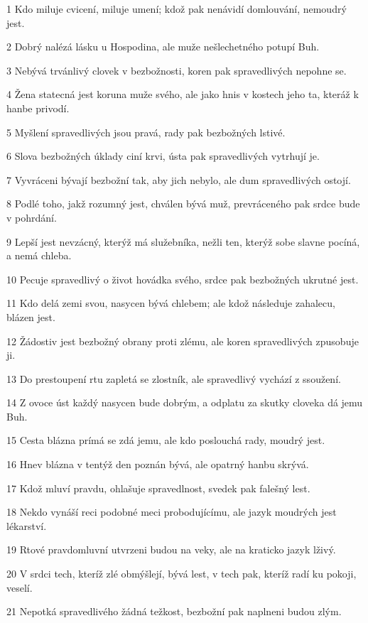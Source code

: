 \par 1 Kdo miluje cvicení, miluje umení; kdož pak nenávidí domlouvání, nemoudrý jest.
\par 2 Dobrý nalézá lásku u Hospodina, ale muže nešlechetného potupí Buh.
\par 3 Nebývá trvánlivý clovek v bezbožnosti, koren pak spravedlivých nepohne se.
\par 4 Žena statecná jest koruna muže svého, ale jako hnis v kostech jeho ta, kteráž k hanbe privodí.
\par 5 Myšlení spravedlivých jsou pravá, rady pak bezbožných lstivé.
\par 6 Slova bezbožných úklady ciní krvi, ústa pak spravedlivých vytrhují je.
\par 7 Vyvráceni bývají bezbožní tak, aby jich nebylo, ale dum spravedlivých ostojí.
\par 8 Podlé toho, jakž rozumný jest, chválen bývá muž, prevráceného pak srdce bude v pohrdání.
\par 9 Lepší jest nevzácný, kterýž má služebníka, nežli ten, kterýž sobe slavne pocíná, a nemá chleba.
\par 10 Pecuje spravedlivý o život hovádka svého, srdce pak bezbožných ukrutné jest.
\par 11 Kdo delá zemi svou, nasycen bývá chlebem; ale kdož následuje zahalecu, blázen jest.
\par 12 Žádostiv jest bezbožný obrany proti zlému, ale koren spravedlivých zpusobuje ji.
\par 13 Do prestoupení rtu zapletá se zlostník, ale spravedlivý vychází z ssoužení.
\par 14 Z ovoce úst každý nasycen bude dobrým, a odplatu za skutky cloveka dá jemu Buh.
\par 15 Cesta blázna prímá se zdá jemu, ale kdo poslouchá rady, moudrý jest.
\par 16 Hnev blázna v tentýž den poznán bývá, ale opatrný hanbu skrývá.
\par 17 Kdož mluví pravdu, ohlašuje spravedlnost, svedek pak falešný lest.
\par 18 Nekdo vynáší reci podobné meci probodujícímu, ale jazyk moudrých jest lékarství.
\par 19 Rtové pravdomluvní utvrzeni budou na veky, ale na kraticko jazyk lživý.
\par 20 V srdci tech, kteríž zlé obmýšlejí, bývá lest, v tech pak, kteríž radí ku pokoji, veselí.
\par 21 Nepotká spravedlivého žádná težkost, bezbožní pak naplneni budou zlým.
